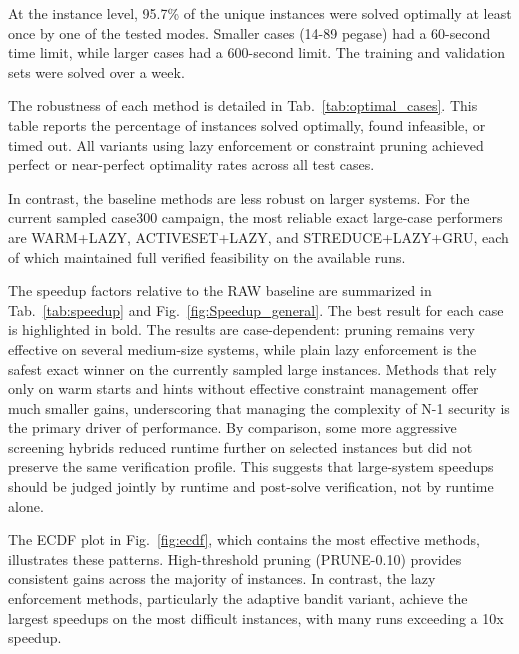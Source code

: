 \documentclass{ieeeaccess}
\begin{document}
At the instance level, 95.7\% of the unique instances were solved optimally at least once by one of the tested modes. Smaller cases (14-89 pegase) had a 60-second time limit, while larger cases had a 600-second limit. The training and validation sets were solved over a week.


The robustness of each method is detailed in Tab.~\ref{tab:optimal_cases}. This table reports the percentage of instances solved optimally, found infeasible, or timed out. All variants using lazy enforcement or constraint pruning achieved perfect or near-perfect optimality rates across all test cases.

In contrast, the baseline methods are less robust on larger systems. For the current sampled case300 campaign, the most reliable exact large-case performers are WARM+LAZY, ACTIVESET+LAZY, and STREDUCE+LAZY+GRU, each of which maintained full verified feasibility on the available runs.

The speedup factors relative to the RAW baseline are summarized in Tab.~\ref{tab:speedup} and Fig.~\ref{fig:Speedup_general}. The best result for each case is highlighted in bold. The results are case-dependent: pruning remains very effective on several medium-size systems, while plain lazy enforcement is the safest exact winner on the currently sampled large instances. Methods that rely only on warm starts and hints without effective constraint management offer much smaller gains, underscoring that managing the complexity of N-1 security is the primary driver of performance.
By comparison, some more aggressive screening hybrids reduced runtime further on selected instances but did not preserve the same verification profile. This suggests that large-system speedups should be judged jointly by runtime and post-solve verification, not by runtime alone.

The ECDF plot in Fig.~\ref{fig:ecdf}, which contains the most effective methods, illustrates these patterns. High-threshold pruning (PRUNE-0.10) provides consistent gains across the majority of instances. In contrast, the lazy enforcement methods, particularly the adaptive bandit variant, achieve the largest speedups on the most difficult instances, with many runs exceeding a 10x speedup.
\end{document}
